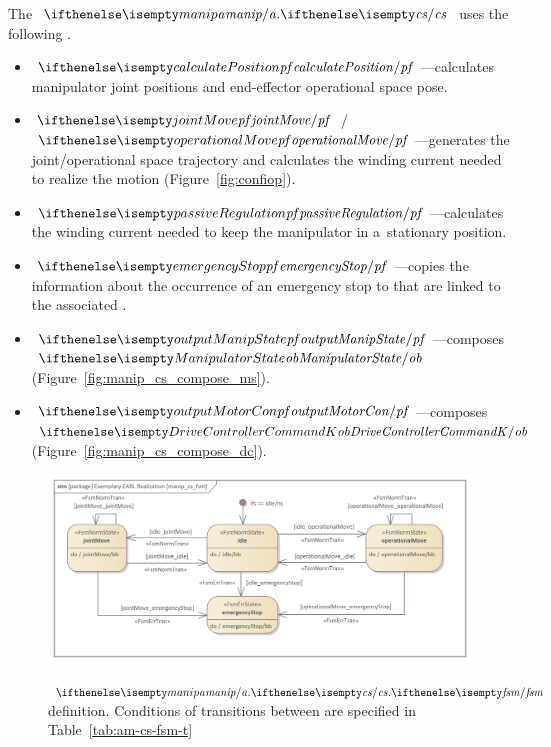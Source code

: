 \documentclass[11pt,oneside,a4paper]{article}
\newcommand{\Table}[0]{Table}
\begin{document}
	
	
	
	The \ControlSubsystem{} $\ea{manip}.\ecs{}$ uses the following \PrimitiveTransitionFunctions{}.
	\begin{itemize}
		\item $\epf{calculatePosition}$---calculates manipulator joint positions and end-effector operational space pose.
		\item $\epf{jointMove}$ / $\epf{operationalMove}$---generates the joint/operational space trajectory and calculates the winding current needed to realize the motion (Figure~\ref{fig:confiop}).
		\item $\epf{passiveRegulation}$---calculates the winding current needed to keep the manipulator in a~stationary position.
		\item $\epf{emergencyStop}$---copies the information about the occurrence of an emergency stop to \OutputBuffers{} that are linked to the associated \Subsystem{} \InputBuffers{}.
		\item $\epf{outputManipState}$---composes $\eob{ManipulatorState}$ (Figure~\ref{fig:manip_cs_compose_ms}).
		\item $\epf{outputMotorCon}$---composes $\eob{DriveControllerCommandK}$ (Figure~\ref{fig:manip_cs_compose_dc}).
	\end{itemize}
	
	
	\begin{figure}[H]
		\centering
		\begin{center}
			{\includegraphics[width=\columnwidth]{img/basic_earl_instance/manip_cs_fsm.png}}
		\end{center}
		\caption{$\protect\ea{manip}.\protect\ecs{}.\protect\efsm{}$ definition. Conditions of transitions between \FsmStates{} are specified in \Table{}~\ref{tab:am-cs-fsm-t}}
		\label{fig:state_machines_a_m}
	\end{figure}
	
\end{document}

